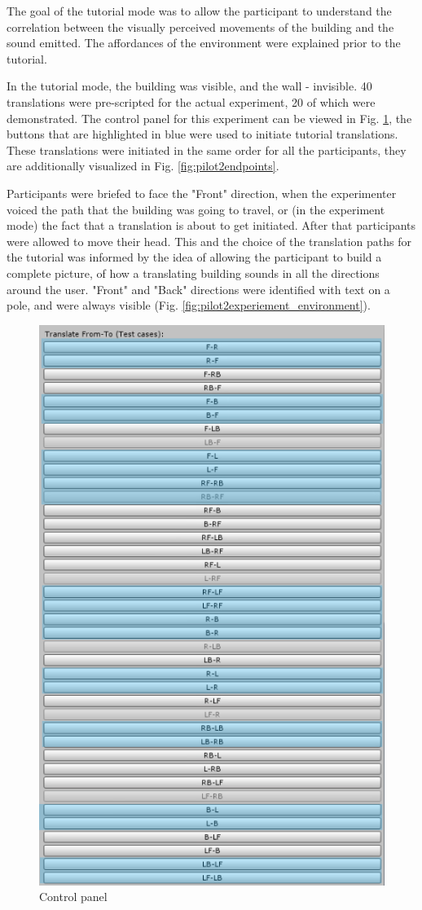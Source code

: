 The goal of the tutorial mode was to allow the participant to understand the correlation between the visually perceived movements of the building and the sound emitted. The affordances of the environment were explained prior to the tutorial.

In the tutorial mode, the building was visible, and the wall - invisible.
40 translations were pre-scripted for the actual experiment, 20 of which were demonstrated. The control panel for this experiment can be viewed in Fig. \ref{fig:pilot2tutorialcontrolpanelhighlighted}, the buttons that are highlighted in blue were used to initiate tutorial translations. These translations were initiated in the same order for all the participants, they are additionally visualized in Fig. \ref{fig:pilot2endpoints}.

Participants were briefed to face the "Front" direction, when the experimenter voiced the path that the building was going to travel, or (in the experiment mode) the fact that a translation is about to get initiated. After that participants were allowed to move their head. This and the choice of the translation paths for the tutorial was informed by the idea of allowing the participant to build a complete picture, of how a translating building sounds in all the directions around the user. "Front" and "Back" directions were identified with text on a pole, and were always visible (Fig. \ref{fig:pilot2experiement_environment}).

\begin{figure}
	\centering
	\includegraphics[width=0.5\linewidth]{figures/pilot2_tutorial_control_panel_highlighted}
	\caption{Control panel}
	\label{fig:pilot2tutorialcontrolpanelhighlighted}
\end{figure}

